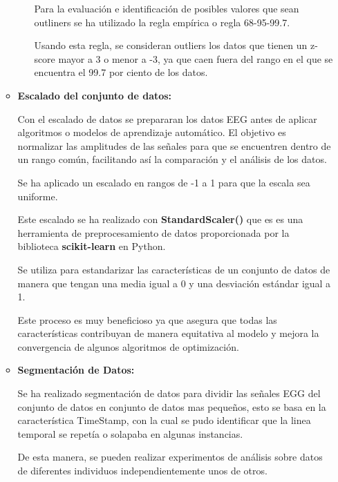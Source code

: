 \begin{enumerate}
\begin{itemize}
\begin{itemize}
	
	Para la evaluación e identificación de posibles valores que sean outliners se ha utilizado la regla empírica o regla	68-95-99.7.~\cite{outliners:empirica}

Usando esta regla, se consideran outliers los datos que tienen un z-score mayor a 3 o menor a -3, ya que caen fuera del rango en el que se encuentra el 99.7 por ciento de los datos.



	\end{itemize}

	\item
	\textbf{Escalado del conjunto de datos:}
		
	Con el escalado de datos se prepararan los datos EEG antes de aplicar algoritmos o modelos de aprendizaje automático. El objetivo es normalizar las amplitudes de las señales para que se encuentren dentro de un rango común, facilitando así la comparación y el análisis de los datos.

Se ha aplicado un escalado en rangos de -1 a 1 para que la escala sea uniforme.

Este escalado se ha realizado con \textbf{StandardScaler()} que es es una herramienta de preprocesamiento de datos proporcionada por la biblioteca \textbf{scikit-learn} en Python. 

Se utiliza para estandarizar las características de un conjunto de datos de manera que tengan una media igual a 0 y una desviación estándar igual a 1.

Este proceso es muy beneficioso ya que asegura que todas las características contribuyan de manera equitativa al modelo y mejora la convergencia de algunos algoritmos de optimización.



 
	\item
	\textbf{Segmentación de Datos:}	
	
	Se ha realizado segmentación de datos para dividir las señales EGG del conjunto de datos en conjunto de datos mas pequeños, esto se basa en la característica TimeStamp, con la cual se pudo identificar que la linea temporal se repetía o solapaba en algunas instancias. 
	
	De esta manera, se pueden realizar experimentos de análisis sobre datos de diferentes individuos independientemente unos de otros.
	
	


\end{itemize}
\end{enumerate}
